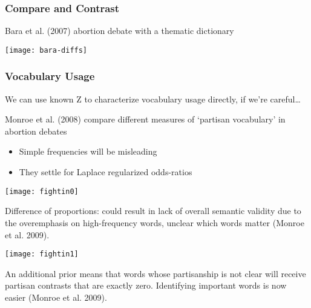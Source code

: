\documentclass[11pt,compress,professionalfonts]{beamer}
\newcommand{\ita}{\begin{itemize}}
\newcommand{\itm}{\item[]}
\newcommand{\itz}{\end{itemize}}
\begin{document}
\begin{frame}[t,fragile]\frametitle{Compare and Contrast}

Bara et al. (2007) abortion debate with a thematic dictionary
\begin{center}
\texttt{[image: bara-diffs]}
\end{center}

\end{frame}
\begin{frame}[t,fragile]\frametitle{Vocabulary Usage}

We can use known Z to characterize vocabulary usage directly, if we're careful\ldots

Monroe et al. (2008) compare different measures of `partisan vocabulary' in abortion debates
\ita
\itm Simple frequencies will be misleading
\itm They settle for Laplace regularized odds-ratios
\itz

\newpage


\centerline{\texttt{[image: fightin0]}}

{\footnotesize Difference of proportions: could result in lack of overall semantic validity due to the overemphasis on high-frequency words, unclear which words matter (Monroe et al. 2009).}

\newpage
\centerline{\texttt{[image: fightin1]}}

{\footnotesize An additional prior means that words whose partisanship is not clear will receive partisan contrasts that are exactly zero. Identifying important words is now easier (Monroe et al. 2009).}

\end{frame}
\end{document}
